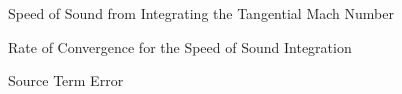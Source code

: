 \documentclass{article}
\begin{document}
\begin{figure}
    \begin{center}
    \scalebox{0.75}{}
    \end{center}
\end{figure}

 \begin{figure}
     \begin{center}
         \scalebox{0.75}{}
     \end{center}
 \end{figure}

 \begin{figure}
     \begin{center}
         \scalebox{0.75}{}
     \end{center}
     \caption{Speed of Sound from Integrating the Tangential Mach Number}
 \end{figure}




 \begin{figure}
     \begin{center}
         \scalebox{0.75}{}
     \end{center}
     \caption{Rate of Convergence for the Speed of Sound Integration}
 \end{figure}

 \begin{figure}
     \begin{center}
         \scalebox{0.75}{}
     \end{center}
     \caption{Source Term Error}
 \end{figure}

%
\end{document}
